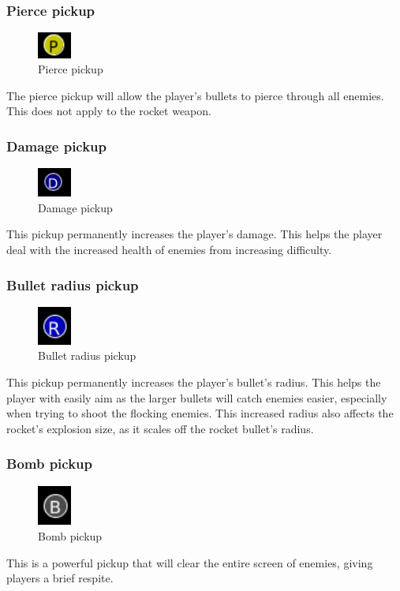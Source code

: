 \documentclass{article}
\begin{document}
\subsubsection{Pierce pickup}
\begin{figure}[H]
\centering
\includegraphics[width=0.1\textwidth, keepaspectratio]{imgs/PiercePickup.png}
\caption{Pierce pickup}
\end{figure}
\noindent
The pierce pickup will allow the player's bullets to pierce through all enemies. This does not apply to the rocket weapon.

\subsubsection{Damage pickup}
\begin{figure}[H]
\centering
\includegraphics[width=0.1\textwidth, keepaspectratio]{imgs/DamagePickup.png}
\caption{Damage pickup}
\end{figure}
\noindent
This pickup permanently increases the player's damage. This helps the player deal with the increased health of enemies from increasing difficulty.

\subsubsection{Bullet radius pickup}
\begin{figure}[H]
\centering
\includegraphics[width=0.1\textwidth, keepaspectratio]{imgs/RadiusPickup.png}
\caption{Bullet radius pickup}
\end{figure}
\noindent
This pickup permanently increases the player's bullet's radius. This helps the player with easily aim as the larger bullets will catch enemies easier, especially when trying to shoot the flocking enemies. This increased radius also affects the rocket's explosion size, as it scales off the rocket bullet's radius.

\subsubsection{Bomb pickup}
\begin{figure}[H]
\centering
\includegraphics[width=0.1\textwidth, keepaspectratio]{imgs/BombPickup.png}
\caption{Bomb pickup}
\end{figure}
\noindent
This is a powerful pickup that will clear the entire screen of enemies, giving players a brief respite. 
\end{document}
